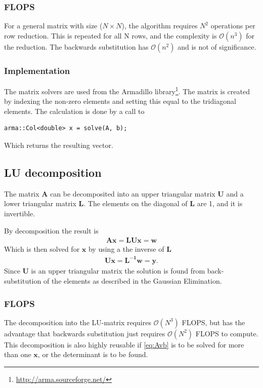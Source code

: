 \documentclass[11pt,a4paper,english]{article}
\numberwithin{equation}{section}
\newcommand{\ve}[1]{\mathbf{#1}} %
\newcommand{\bigO}[1]{\mathcal{O}\left( #1 \right)}
\begin{document}
\subsubsection{FLOPS}
For a general matrix with size ($N\times N$), the algorithm requires
$N^2$ operations per row reduction. This is repeated for all N rows,
and the complexity is $\bigO{n^3}$ for the reduction. The backwards 
substitution has $\bigO{n^2}$ and is not of significance.



\subsubsection{Implementation}
\label{subsubsec:impl_gauss}
The matrix solvers are used from the Armadillo 
library\footnote{\url{http://arma.sourceforge.net/}}. The matrix is
created by indexing the non-zero elements and setting this equal to the 
tridiagonal elements. The calculation is done by a call to 
\begin{lstlisting}
arma::Col<double> x = solve(A, b);
\end{lstlisting}
Which returns the resulting vector.

\subsection{LU decomposition}

The matrix $\ve{A}$ can be decomposited into an upper triangular matrix $\ve{U}$ and 
a lower triangular matrix $\ve{L}$. The elements on the diagonal of $\ve{L}$ are 1,
and it is invertible.

By decomposition the result is
\begin{gather}
\ve{Ax} = \ve{LUx} = \ve{w}
\end{gather}
Which is then solved for $\ve{x}$ by using a the inverse of $\ve{L}$
\begin{gather}
\ve{Ux} = \ve{L^{-1}w} = \ve{y}.
\end{gather}
Since $\ve{U}$ is an upper triangular matrix the solution is found from back-substitution
of the elements as described in the Gaussian Elimination.

\subsubsection{FLOPS}
The decomposition into the LU-matrix requires $\bigO{N^3}$ FLOPS, but 
has the advantage that backwards substitution just requires $\bigO{N^2}$
FLOPS to compute. This decomposition is also highly reusable if \eqref{eq:Avb}
is to be solved for more than one $\ve{x}$, or the determinant is to be found.
\end{document}
